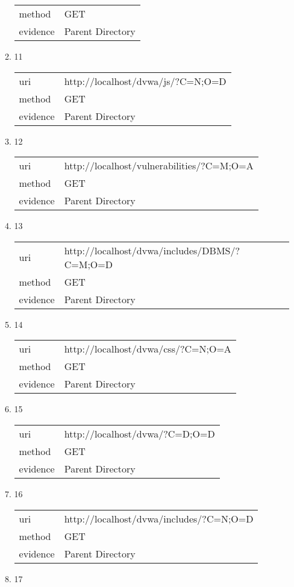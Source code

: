 \documentclass[10pt]{article}
\begin{document}
\begin{itemize}
\begin{enumerate}
\begin{tabular}{| l | p{14cm}}
method & GET \\
evidence & Parent Directory \\
\end{tabular}
\item[] 11
\begin{tabular}{| l | p{14cm}}
uri & http://localhost/dvwa/js/?C=N;O=D \\
method & GET \\
evidence & Parent Directory \\
\end{tabular}
\item[] 12
\begin{tabular}{| l | p{14cm}}
uri & http://localhost/vulnerabilities/?C=M;O=A \\
method & GET \\
evidence & Parent Directory \\
\end{tabular}
\item[] 13
\begin{tabular}{| l | p{14cm}}
uri & http://localhost/dvwa/includes/DBMS/?C=M;O=D \\
method & GET \\
evidence & Parent Directory \\
\end{tabular}
\item[] 14
\begin{tabular}{| l | p{14cm}}
uri & http://localhost/dvwa/css/?C=N;O=A \\
method & GET \\
evidence & Parent Directory \\
\end{tabular}
\item[] 15
\begin{tabular}{| l | p{14cm}}
uri & http://localhost/dvwa/?C=D;O=D \\
method & GET \\
evidence & Parent Directory \\
\end{tabular}
\item[] 16
\begin{tabular}{| l | p{14cm}}
uri & http://localhost/dvwa/includes/?C=N;O=D \\
method & GET \\
evidence & Parent Directory \\
\end{tabular}
\item[] 17
\begin{tabular}{| l | p{14cm}}

\end{tabular}
\end{enumerate}
\end{itemize}
\end{document}
